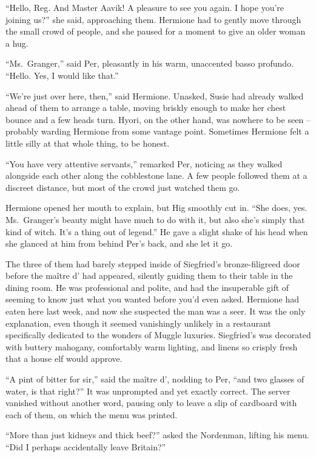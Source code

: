 ``Hello, Reg. And Master Aavik! A pleasure to see you again. I hope
you're joining us?'' she said, approaching them. Hermione had to gently
move through the small crowd of people, and she paused for a moment to
give an older woman a hug.

``Ms.~Granger,'' said Per, pleasantly in his warm, unaccented basso
profundo. ``Hello. Yes, I would like that.''

``We're just over here, then,'' said Hermione. Unasked, Susie had
already walked ahead of them to arrange a table, moving briskly enough
to make her chest bounce and a few heads turn. Hyori, on the other hand,
was nowhere to be seen -- probably warding Hermione from some vantage
point. Sometimes Hermione felt a little silly at that whole thing, to be
honest.

``You have very attentive servants,'' remarked Per, noticing as they
walked alongside each other along the cobblestone lane. A few people
followed them at a discreet distance, but most of the crowd just watched
them go.

Hermione opened her mouth to explain, but Hig smoothly cut in. ``She
does, yes. Ms.~Granger's beauty might have much to do with it, but also
she's simply that kind of witch. It's a thing out of legend.'' He gave a
slight shake of his head when she glanced at him from behind Per's back,
and she let it go.

The three of them had barely stepped inside of Siegfried's
bronze-filigreed door before the maître d' had appeared, silently
guiding them to their table in the dining room. He was professional and
polite, and had the insuperable gift of seeming to know just what you
wanted before you'd even asked. Hermione had eaten here last week, and
now she suspected the man was a seer. It was the only explanation, even
though it seemed vanishingly unlikely in a restaurant specifically
dedicated to the wonders of Muggle luxuries. Siegfried's was decorated
with buttery mahogany, comfortably warm lighting, and linens so crisply
fresh that a house elf would approve.

``A pint of bitter for sir,'' said the maître d', nodding to Per, ``and
two glasses of water, is that right?'' It was unprompted and yet exactly
correct. The server vanished without another word, pausing only to leave
a slip of cardboard with each of them, on which the menu was printed.

``More than just kidneys and thick beef?'' asked the Nordenman, lifting
his menu. ``Did I perhaps accidentally leave Britain?''

